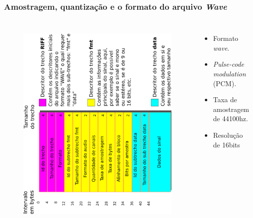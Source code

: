 \begin{frame}
	\frametitle{Amostragem, quantização e o formato do arquivo \textit{Wave}}
	\begin{columns}
		\begin{figure}
			\includegraphics[width=0.70\linewidth, angle=-90]{../monography/images/wavePcmStructure.pdf}
			\label{fig:wavePcmStructure}
		\end{figure}
		\begin{itemize}
			\item Formato \textit{wave}.
			\item \textit{Pulse-code modulation} (PCM).
			\item Taxa de amostragem de 44100hz.
			\item Resolução de 16bits
		\end{itemize}
	\end{columns}
\end{frame}